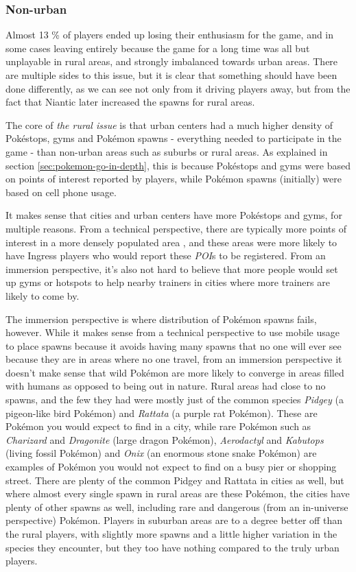 \subsubsection{Non-urban}
\label{sec:the-rural-problem}
Almost 13 \% of players ended up losing their enthusiasm for the game, and in some cases leaving entirely because the game for a long time was all but unplayable in rural areas, and strongly imbalanced towards urban areas. There are multiple sides to this issue, but it is clear that something should have been done differently, as we can see not only from it driving players away, but from the fact that Niantic later increased the spawns for rural areas.

The core of \emph{the rural issue} is that urban centers had a much higher density of Pokéstops, gyms and Pokémon spawns - everything needed to participate in the game - than non-urban areas such as suburbs or rural areas. As explained in section \ref{sec:pokemon-go-in-depth}, this is because Pokéstops and gyms were based on points of interest reported by players, while Pokémon spawns (initially) were based on cell phone usage.

It makes sense that cities and urban centers have more Pokéstops and gyms, for multiple reasons. From a technical perspective, there are typically more points of interest in a more densely populated area , and these areas were more likely to have Ingress players who would report these \emph{POI}s to be registered. From an immersion perspective, it's also not hard to believe that more people would set up gyms or hotspots to help nearby trainers in cities where more trainers are likely to come by.

The immersion perspective is where distribution of Pokémon spawns fails, however. While it makes sense from a technical perspective to use mobile usage to place spawns because it avoids having many spawns that no one will ever see because they are in areas where no one travel, from an immersion perspective it doesn't make sense that wild Pokémon are more likely to converge in areas filled with humans as opposed to being out in nature. Rural areas had close to no spawns, and the few they had were mostly just of the common species \emph{Pidgey} (a pigeon-like bird Pokémon) and \emph{Rattata} (a purple rat Pokémon). These are Pokémon you would expect to find in a city, while rare Pokémon such as \emph{Charizard} and \emph{Dragonite} (large dragon Pokémon), \emph{Aerodactyl} and \emph{Kabutops} (living fossil Pokémon) and \emph{Onix} (an enormous stone snake Pokémon) are examples of Pokémon you would not expect to find on a busy pier or shopping street. There are plenty of the common Pidgey and Rattata in cities as well, but where almost every single spawn in rural areas are these Pokémon, the cities have plenty of other spawns as well, including rare and dangerous (from an in-universe perspective) Pokémon. Players in suburban areas are to a degree better off than the rural players, with slightly more spawns and a little higher variation in the species they encounter, but they too have nothing  compared to the truly urban players.

